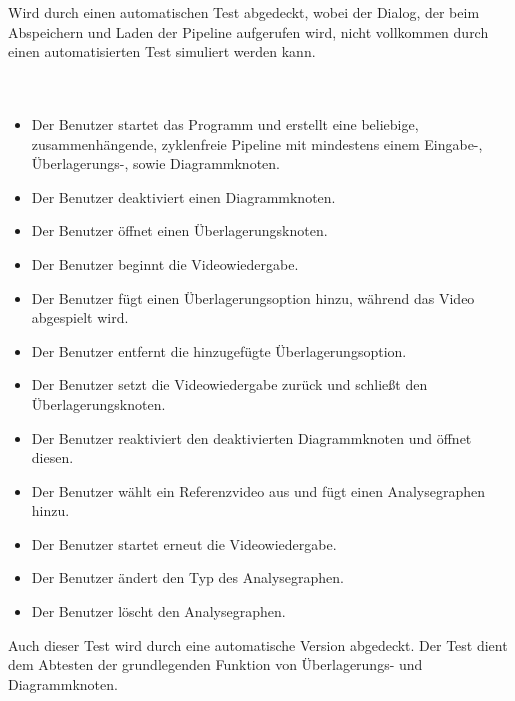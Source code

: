 Wird durch einen automatischen Test abgedeckt, wobei der Dialog, der beim Abspeichern und Laden der Pipeline aufgerufen wird, nicht vollkommen durch einen automatisierten Test simuliert werden kann.

\paragraph{}

\paragraph{} ~\\
 
\begin{itemize}
	\item Der Benutzer startet das Programm und erstellt eine beliebige, zusammenhängende, zyklenfreie Pipeline mit mindestens einem Eingabe-, Überlagerungs-, sowie Diagrammknoten.
	\item Der Benutzer deaktiviert einen Diagrammknoten.
	\item Der Benutzer öffnet einen Überlagerungsknoten.
	\item Der Benutzer beginnt die Videowiedergabe.
	\item Der Benutzer fügt einen Überlagerungsoption hinzu, während das Video abgespielt wird.
	\item Der Benutzer entfernt die hinzugefügte Überlagerungsoption.
	\item Der Benutzer setzt die Videowiedergabe zurück und schließt den Überlagerungsknoten.
	\item Der Benutzer reaktiviert den deaktivierten Diagrammknoten und öffnet diesen.
	\item Der Benutzer wählt ein Referenzvideo aus und fügt einen Analysegraphen hinzu.
	\item Der Benutzer startet erneut die Videowiedergabe.
	\item Der Benutzer ändert den Typ des Analysegraphen.
	\item Der Benutzer löscht den Analysegraphen.
\end{itemize}

Auch dieser Test wird durch eine automatische Version abgedeckt. Der Test dient dem Abtesten der grundlegenden Funktion von Überlagerungs- und Diagrammknoten.
